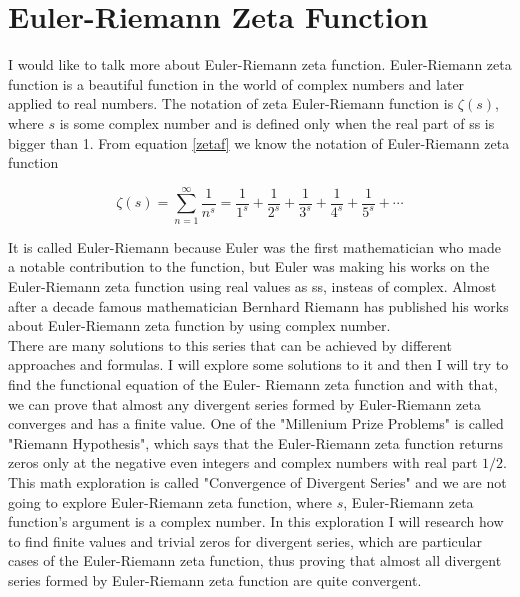 \documentclass[a4paper]{article}
\begin{document}
\section{Euler-Riemann Zeta Function}
\label{sec:org6ff87a5}

I would like to talk more about Euler-Riemann zeta function. Euler-Riemann zeta
function is a beautiful function in the world of complex numbers and later
applied to real numbers. The notation of zeta Euler-Riemann function is
\(\zeta(s)\), where \(s\) is some complex number and is defined only when the real
part of ss is bigger than 1. From equation \ref{zetaf} we know the notation of
Euler-Riemann zeta function 

\begin{equation*}
  \zeta(s)=\sum_{n=1}^{\infty} \frac{1}{n^s}=\frac{1}{1^s}+\frac{1}{2^s}+\frac{1}{3^s}+
  \frac{1}{4^s}+\frac{1}{5^s}+\cdots
  \end{equation*}

It is called Euler-Riemann because Euler was the first mathematician who made a
notable contribution to the function, but Euler was making his works on the
Euler-Riemann zeta function using real values as ss, insteas of complex. Almost
after a decade famous mathematician Bernhard Riemann has published his works
about Euler-Riemann zeta function by using complex number.\\

There are many solutions to this series that can be achieved by different
approaches and formulas. I will explore some solutions to it and then I will try
to find the functional equation of the Euler- Riemann zeta function and with
that, we can prove that almost any divergent series formed by Euler-Riemann zeta
converges and has a finite value. One of the "Millenium Prize Problems" is
called "Riemann Hypothesis", which says that the Euler-Riemann zeta function
returns zeros only at the negative even integers and complex numbers with real
part \(1/2\).\\

This math exploration is called "Convergence of Divergent Series" and we are not
going to explore Euler-Riemann zeta function, where \(s\), Euler-Riemann zeta
function's argument is a complex number. In this exploration I will research how
to find finite values and trivial zeros for divergent series, which are
particular cases of the Euler-Riemann zeta function, thus proving that almost
all divergent series formed by Euler-Riemann zeta function are quite
convergent.\\
\end{document}
